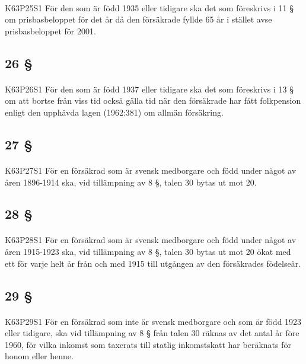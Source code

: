 \documentclass[a4paper,notitlepage,openany,10pt]{book}
\begin{document}
\paragraph*{}
{\tiny K63P25S1}
För den som är född 1935 eller tidigare ska det som föreskrivs i 11 § om prisbasbeloppet för det år då den försäkrade fyllde 65 år i stället avse prisbasbeloppet för 2001.
\subsection*{26 §}
\paragraph*{}
{\tiny K63P26S1}
För den som är född 1937 eller tidigare ska det som föreskrivs i 13 § om att bortse från viss tid också gälla tid när den försäkrade har fått folkpension enligt den upphävda lagen (1962:381) om allmän försäkring.
\subsection*{27 §}
\paragraph*{}
{\tiny K63P27S1}
För en försäkrad som är svensk medborgare och född under något av åren 1896-1914 ska, vid tillämpning av 8 §, talen 30 bytas ut mot 20.
\subsection*{28 §}
\paragraph*{}
{\tiny K63P28S1}
För en försäkrad som är svensk medborgare och född under något av åren 1915-1923 ska, vid tillämpning av 8 §, talen 30 bytas ut mot 20 ökat med ett för varje helt år från och med 1915 till utgången av den försäkrades födelseår.
\subsection*{29 §}
\paragraph*{}
{\tiny K63P29S1}
För en försäkrad som inte är svensk medborgare och som är född 1923 eller tidigare, ska vid tillämpning av 8 § från talen 30 räknas av det antal år före 1960, för vilka inkomst som taxerats till statlig inkomstskatt har beräknats för honom eller henne.
\end{document}
